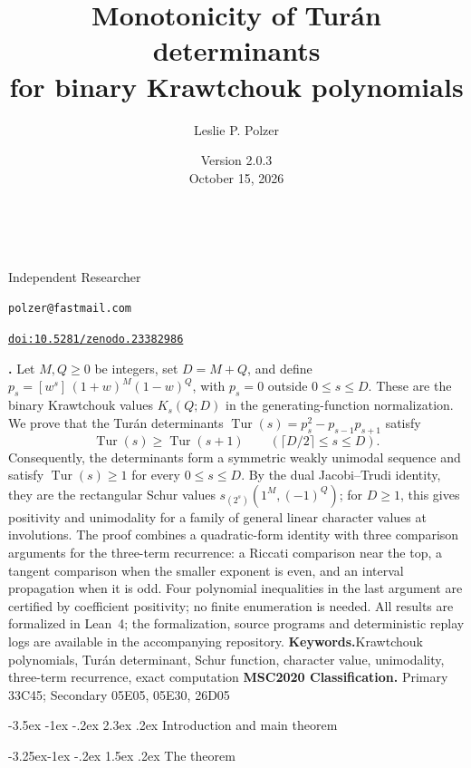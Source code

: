\documentclass[twoside,10pt]{article}
\makeatletter
\numberwithin{equation}{section}
\theoremstyle{slbody}
\theoremstyle{definition}
\theoremstyle{remark}
\numberwithin{theorem}{section}
\DeclareMathOperator{\Tur}{Tur}
\newcommand{\coeff}[1]{[#1]\,}
\newcommand{\paperclassification}{Primary 33C45; Secondary 05E05, 05E30, 26D05}
\newcommand{\paperkeywords}{Krawtchouk polynomials, Tur\'an determinant,
  Schur function, character value, unimodality, three-term recurrence,
  exact computation}
\newcommand{\paperaffiliation}{Independent Researcher}
\newcommand{\paperemail}{polzer@fastmail.com}
\newcommand{\paperversion}{Version 2.0.3}
\newcommand{\paperdate}{October 15, 2026}
\newcommand{\paperdoi}{10.5281/zenodo.23382986}
\renewcommand{\section}{%
  \@startsection{section}{1}{\z@}%
    {-3.5ex \@plus -1ex \@minus -.2ex}%
    {2.3ex \@plus .2ex}%
    {\normalfont\large\bfseries}}
\renewcommand{\subsection}{%
  \@startsection{subsection}{2}{\z@}%
    {-3.25ex\@plus -1ex \@minus -.2ex}%
    {1.5ex \@plus .2ex}%
    {\normalfont\normalsize\bfseries}}
\renewcommand{\maketitle}{%
  \begin{center}
    {\large\bfseries\@title}\\
    \vskip24pt
    \ifx\@author\@empty
      \mbox{}\par
    \else
      {\scshape\@author}\par
      \medskip
      {\small\paperaffiliation}\par
      \smallskip
      {\small\texttt{\paperemail}}\par
      \smallskip
      {\small\@date}\par
      \smallskip
      {\small\href{https://doi.org/\paperdoi}{\texttt{doi:\paperdoi}}}\par
    \fi
    \vskip24pt
  \end{center}}
\renewenvironment{abstract}
  {\quotation\noindent\small{\bfseries\abstractname.\enspace}}
  {\endquotation}
\makeatother
\begin{document}
\title{Monotonicity of Tur\'an determinants\\
for binary Krawtchouk polynomials}

\author{Leslie P. Polzer}

\date{\paperversion\\\paperdate}

\maketitle

\begin{abstract}
Let $M,Q\ge0$ be integers, set $D=M+Q$, and define
$p_s=\coeff{w^s}(1+w)^M(1-w)^Q$, with $p_s=0$ outside $0\le s\le D$.
These are the binary Krawtchouk values $K_s(Q;D)$ in the generating-function
normalization.  We prove that the Tur\'an determinants
$\Tur(s)=p_s^2-p_{s-1}p_{s+1}$ satisfy
\[
  \Tur(s)\ge\Tur(s+1)
  \qquad (\lceil D/2\rceil\le s\le D).
\]
Consequently, the determinants form a symmetric weakly unimodal sequence
and satisfy $\Tur(s)\ge1$ for every $0\le s\le D$.  By the dual
Jacobi--Trudi identity, they are the rectangular Schur values
$s_{(2^s)}(1^M,(-1)^Q)$; for $D\ge1$, this gives positivity and unimodality
for a family of general linear character values at involutions.  The proof
combines a quadratic-form identity with three comparison arguments for the
three-term recurrence: a Riccati comparison near the top, a tangent
comparison when the smaller exponent is even, and an interval propagation
when it is odd.  Four polynomial inequalities in the last argument are
certified by coefficient positivity; no finite enumeration is needed.
All results are formalized in Lean~4; the formalization, source programs and
deterministic replay logs are available in the accompanying repository.
\vskip5pt
\noindent\textbf{Keywords.}\enspace\paperkeywords
\vskip5pt
\noindent\textbf{MSC2020 Classification.}\enspace
\paperclassification
\end{abstract}

\vskip24pt
\baselineskip=13.5pt

\section{Introduction and main theorem}\label{sec:intro}

\subsection{The theorem}\label{subsec:krawtchouk-form}
\end{document}
